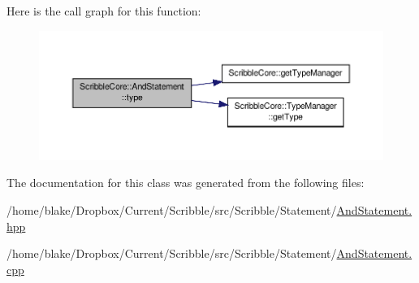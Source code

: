 Here is the call graph for this function\-:
\nopagebreak
\begin{figure}[H]
\begin{center}
\leavevmode
\includegraphics[width=350pt]{class_scribble_core_1_1_and_statement_a957b93b036c51ac746c18ad7fbfcda71_cgraph}
\end{center}
\end{figure}




The documentation for this class was generated from the following files\-:\begin{DoxyCompactItemize}
\item 
/home/blake/\-Dropbox/\-Current/\-Scribble/src/\-Scribble/\-Statement/\hyperlink{_and_statement_8hpp}{And\-Statement.\-hpp}\item 
/home/blake/\-Dropbox/\-Current/\-Scribble/src/\-Scribble/\-Statement/\hyperlink{_and_statement_8cpp}{And\-Statement.\-cpp}\end{DoxyCompactItemize}
